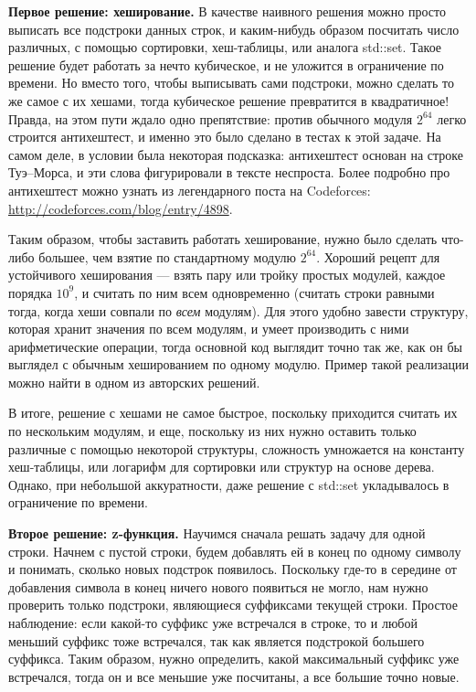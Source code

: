 \documentclass[12pt]{article}
\theoremstyle{definition}
\begin{document}
\textbf{Первое решение: хеширование.} В качестве наивного решения можно просто выписать все подстроки данных строк, и каким-нибудь образом посчитать число различных,
с помощью сортировки, хеш-таблицы, или аналога std::set. Такое решение будет работать за
нечто кубическое, и не уложится в ограничение по времени. Но вместо того, чтобы
выписывать сами подстроки, можно сделать то же самое с их хешами, тогда кубическое
решение превратится в квадратичное! Правда, на этом пути ждало одно препятствие:
против обычного модуля $2^{64}$ легко строится антихештест, и именно это
было сделано в тестах к этой задаче. На самом деле, в условии была некоторая
подсказка: антихештест основан на строке Туэ--Морса, и эти слова
фигурировали в тексте неспроста. Более подробно про антихештест можно
узнать из легендарного поста на Codeforces: \url{http://codeforces.com/blog/entry/4898}.

Таким образом, чтобы заставить работать хеширование, нужно было сделать что-либо
большее, чем взятие по стандартному модулю $2^{64}$. Хороший рецепт
для устойчивого хеширования --- взять пару или тройку простых модулей, каждое
порядка $10^9$, и считать по ним всем одновременно (считать строки равными тогда,
когда хеши совпали по \emph{всем} модулям). Для этого удобно завести структуру,
которая хранит значения по всем модулям, и умеет производить с ними арифметические
операции, тогда основной код выглядит точно так же, как он бы выглядел с обычным
хешированием по одному модулю. Пример такой реализации можно найти в одном из авторских решений.

В итоге, решение с хешами не самое быстрое, поскольку приходится считать их по нескольким
модулям, и еще, поскольку из них нужно оставить только различные с помощью некоторой
структуры, сложность умножается на константу хеш-таблицы, или логарифм для сортировки или
структур на основе дерева. Однако, при небольшой аккуратности, даже решение с std::set
укладывалось в ограничение по времени.

\textbf{Второе решение: z-функция.} Научимся сначала решать задачу для одной строки.
Начнем с пустой строки, будем добавлять ей в конец по одному символу и понимать,
сколько новых подстрок появилось. Поскольку где-то в середине от добавления символа в
конец ничего нового появиться не могло, нам нужно проверить только подстроки,
являющиеся суффиксами текущей строки. Простое наблюдение: если какой-то суффикс
уже встречался в строке, то и любой меньший суффикс тоже встречался, так как является
подстрокой большего суффикса. Таким образом, нужно определить, какой максимальный
суффикс уже встречался, тогда он и все меньшие уже посчитаны, а все большие точно новые.
\end{document}
